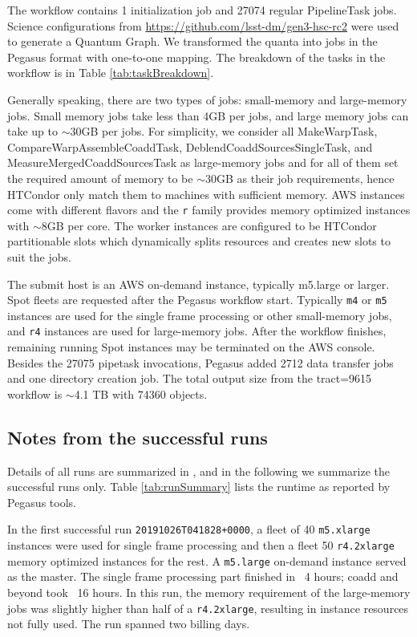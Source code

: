 The workflow contains 1 initialization job and 27074 regular PipelineTask jobs.
Science configurations from \url{https://github.com/lsst-dm/gen3-hsc-rc2} were used to generate a Quantum Graph.
We transformed the quanta into jobs in the Pegasus format with one-to-one mapping.
The breakdown of the tasks in the workflow is in Table \ref{tab:taskBreakdown}.



Generally speaking, there are two types of jobs: small-memory and large-memory jobs.
Small memory jobs take less than 4GB per jobs, and large memory jobs can take up to $\sim$30GB per jobs.
For simplicity, we consider all MakeWarpTask, CompareWarpAssembleCoaddTask, DeblendCoaddSourcesSingleTask, and MeasureMergedCoaddSourcesTask as large-memory jobs and for all of them set the required amount of memory to be $\sim$30GB as their job requirements, hence HTCondor only match them to machines with sufficient memory.
AWS instances come with different flavors and the \texttt{r} family provides memory optimized instances with $\sim$8GB per core.
The worker instances are configured to be HTCondor partitionable slots which dynamically splits resources and creates new slots to suit the jobs.

The submit host is an AWS on-demand instance, typically m5.large or larger.
Spot fleets are requested after the Pegasus workflow start.
Typically \texttt{m4} or \texttt{m5} instances are used for the single frame processing or other small-memory jobs, and \texttt{r4} instances are used for large-memory jobs.
After the workflow finishes, remaining running Spot instances may be terminated on the AWS console.
Besides the 27075 pipetask invocations, Pegasus added 2712 data transfer jobs and one directory creation job.
The total output size from the tract=9615 workflow is $\sim$4.1 TB with 74360 objects.

\subsection{Notes from the successful runs}

Details of all runs are summarized in , and in the following we summarize the successful runs only.
Table \ref{tab:runSummary} lists the runtime as reported by Pegasus tools.



In the first successful run \texttt{20191026T041828+0000}, a fleet of 40 \texttt{m5.xlarge} instances were used for single frame processing and then a fleet 50 \texttt{r4.2xlarge} memory optimized instances for the rest.
A \texttt{m5.large} on-demand instance served as the master.
The single frame processing part finished in ~4 hours; coadd and beyond took ~16 hours.
In this run, the memory requirement of the large-memory jobs was slightly higher than half of a \texttt{r4.2xlarge}, resulting in instance resources not fully used.
The run spanned two billing days.


